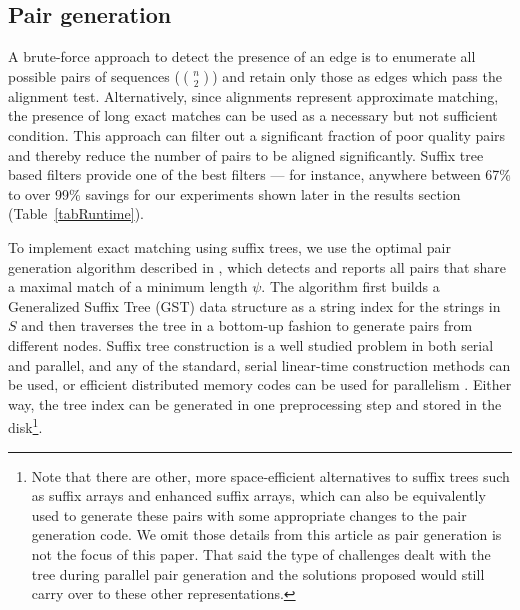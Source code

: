 \documentclass[10pt,journal,letterpaper,compsoc]{IEEEtran}
\begin{document}

\subsection{Pair generation}
\label{secGeneratingPairs}

A brute-force approach to detect the presence of an edge is to enumerate all possible  pairs of sequences ($n\choose 2$) and retain only those as edges which pass the alignment test. Alternatively, since alignments represent approximate matching, the presence of long exact matches can be used as a necessary but not sufficient condition. This approach can filter out a significant fraction of poor quality pairs and thereby reduce the number of pairs to be aligned significantly. Suffix tree based filters provide one of the best filters --- for instance, anywhere between 67\% to over 99\% savings for our experiments shown later in the results section (Table~\ref{tabRuntime}). 


To implement exact matching using suffix trees, we use the optimal pair generation algorithm described in \cite{KalyanaramanTPDS03}, which detects and reports all pairs that share a maximal match of a minimum length $\psi$. The algorithm first builds a Generalized Suffix Tree (GST) data structure \cite{Weiner73} as a string index for the strings in $S$ and then traverses the tree in a bottom-up fashion to generate pairs from different nodes. Suffix tree construction is a well studied problem in both serial and parallel, and any of the standard, serial linear-time construction methods \cite{McCreight76,Ukkonen90,Weiner73} can be used, or efficient distributed memory codes can be used for parallelism \cite{KalyanaramanJPDC07,Ghoting09}.  Either way, the tree index can be generated in one preprocessing step and stored in the disk\footnote{Note that there are other, more space-efficient alternatives to suffix trees such as suffix arrays and enhanced suffix arrays, which can also be equivalently used to generate these pairs with some appropriate changes to the pair generation code. We omit those details from this article as pair generation is not the focus of this paper. That said the type of challenges dealt with the tree during parallel pair generation and the solutions proposed would still carry over to these other representations.}. 
\end{document}
